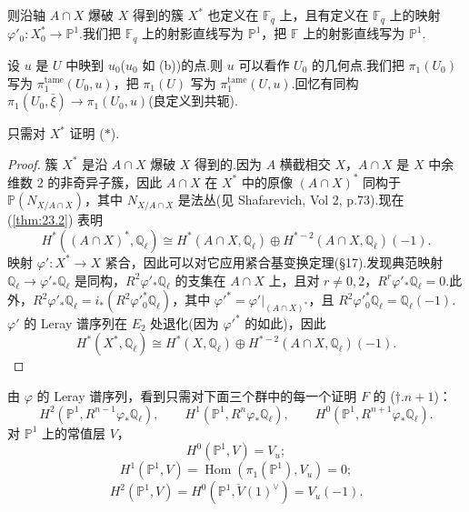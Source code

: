 则沿轴 $A \cap X$ 爆破 $X$ 得到的簇 $X^{*}$ 也定义在 $\mathbb{F}_q$ 上，且有定义在 $\mathbb{F}_q$ 上的映射 $\varphi'_0 \colon X^{*}_0 \to \mathbb{P}^{1}$.我们把 $\mathbb{F}_q$ 上的射影直线写为 $\mathbb{P}^{1}$，把 $\mathbb{F}$ 上的射影直线写为 $\mathbb{P}^{1}$.

设 $u$ 是 $U$ 中映到 $u_0$($u_0$ 如 (b))的点.则 $u$ 可以看作 $U_0$ 的几何点.我们把 $\pi_1(U_0)$ 写为 $\pi^{\mathrm{tame}}_1(U_0, u)$，把 $\pi_1(U)$ 写为 $\pi^{\mathrm{tame}}_1(U, u)$.回忆有同构 $\pi_1(U_0, \bar{\xi}) \to \pi_1(U_0, u)$(良定义到共轭).

\begin{lemma}\label{lem:33.2}
只需对 $X^{*}$ 证明 ($*$).
\end{lemma}

\begin{proof}
簇 $X^{*}$ 是沿 $A \cap X$ 爆破 $X$ 得到的.因为 $A$ 横截相交 $X$，$A \cap X$ 是 $X$ 中余维数 2 的非奇异子簇，因此 $A \cap X$ 在 $X^{*}$ 中的原像 $(A \cap X)^{*}$ 同构于 $\mathbb{P}(N_{X/A \cap X})$，其中 $N_{X/A \cap X}$ 是法丛(见 Shafarevich, Vol 2, p.73).现在 (\ref{thm:23.2}) 表明
\[
H^{*}((A \cap X)^{*}, \mathbb{Q}_{\ell}) \cong H^{*}(A \cap X, \mathbb{Q}_{\ell}) \oplus H^{*-2}(A \cap X, \mathbb{Q}_{\ell})(-1).
\]
映射 $\varphi' \colon X^{*} \to X$ 紧合，因此可以对它应用紧合基变换定理(\S 17).发现典范映射 $\mathbb{Q}_{\ell} \to \varphi'_*\mathbb{Q}_{\ell}$ 是同构，$R^{2}\varphi'_*\mathbb{Q}_{\ell}$ 的支集在 $A \cap X$ 上，且对 $r \neq 0, 2$，$R^{r}\varphi'_*\mathbb{Q}_{\ell} = 0$.此外，$R^{2}\varphi'_*\mathbb{Q}_{\ell} = i_{*}(R^{2}\varphi'^{*}_0\mathbb{Q}_{\ell})$，其中 $\varphi'^{*} = \varphi'|_{(A \cap X)^{*}}$，且 $R^{2}\varphi'^{*}_0\mathbb{Q}_{\ell} = \mathbb{Q}_{\ell}(-1)$.$\varphi'$ 的 Leray 谱序列在 $E_2$ 处退化(因为 $\varphi'^{*}$ 的如此)，因此
\[
H^{*}(X^{*}, \mathbb{Q}_{\ell}) \cong H^{*}(X, \mathbb{Q}_{\ell}) \oplus H^{*-2}(A \cap X, \mathbb{Q}_{\ell})(-1).
\]
\end{proof}

由 $\varphi$ 的 Leray 谱序列，看到只需对下面三个群中的每一个证明 $F$ 的 ($\dagger.n+1$)：
\[
H^{2}(\mathbb{P}^{1}, R^{n-1}\varphi_{*}\mathbb{Q}_{\ell}), \qquad H^{1}(\mathbb{P}^{1}, R^{n}\varphi_{*}\mathbb{Q}_{\ell}), \qquad H^{0}(\mathbb{P}^{1}, R^{n+1}\varphi_{*}\mathbb{Q}_{\ell}).
\]
对 $\mathbb{P}^{1}$ 上的常值层 $V$，
\[
H^{0}(\mathbb{P}^{1}, V) = V_u;
\]
\[
H^{1}(\mathbb{P}^{1}, V) = \operatorname{Hom}(\pi_1(\mathbb{P}^{1}), V_u) = 0;
\]
\[
H^{2}(\mathbb{P}^{1}, V) = H^{0}(\mathbb{P}^{1}, \check{V}(1)^{\vee}) = V_u(-1).
\]

